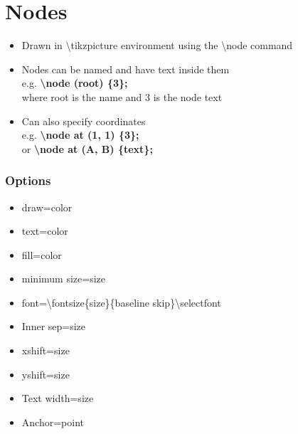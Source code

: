 \documentclass{article}
\newcommand{\bs}{\textbackslash}
\begin{document}
	

\section*{Nodes}
\begin{itemize}
	\item Drawn in \bs tikzpicture environment using the \bs node command
	\item Nodes can be named and have text inside them \\
	e.g. \textbf{\bs node (root) \{3\};}  \\
	where root is the name and 3 is the node text


	\item Can also specify coordinates \\
	e.g. \textbf{\bs node at (1, 1) \{3\};} \\
	or \textbf{\bs node at (A, B) \{text\};}

\end{itemize}

\subsubsection*{Options}
\begin{itemize}
\setlength\itemsep{0cm}
	\item draw=color
	\item text=color
	\item fill=color 
	\item minimum size=size
	\item font=\bs fontsize\{size\}\{baseline skip\}\bs selectfont
	\item Inner sep=size
	\item xshift=size
	\item yshift=size
	\item Text width=size
	\item Anchor=point
\end{itemize}
\end{document}
